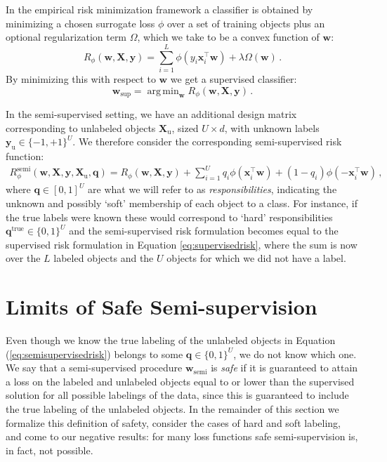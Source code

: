 \documentclass[twoside]{memoir}\usepackage[]{graphicx}\usepackage{xcolor}
\DeclareMathOperator*{\argmin}{arg\,min}
\begin{document}
In the empirical risk minimization framework a classifier is obtained by minimizing a chosen surrogate loss $\phi$ over a set of training objects plus an optional regularization term $\Omega$, which we take to be a convex function of $\mathbf{w}$:
\begin{equation} \label{eq:supervisedrisk}
R_\phi(\mathbf{w},\mathbf{X},\mathbf{y}) = \sum_{i=1}^L \phi(y_i \mathbf{x}_i^\top \mathbf{w}) + \lambda \Omega(\mathbf{w})\, .
\end{equation}
By minimizing this with respect to $\mathbf{w}$ we get a supervised classifier:
$$\mathbf{w}_\mathrm{sup} = \argmin_\mathbf{w} R_\phi(\mathbf{w},\mathbf{X},\mathbf{y}) \, .$$

In the semi-supervised setting, we have an additional design matrix corresponding to unlabeled objects $\mathbf{X}_\mathrm{u}$, sized $U \times d$, with unknown labels $\mathbf{y}_\mathrm{u} \in \{{-1},{+1}\}^U$.
We therefore consider the corresponding semi-supervised risk function:
\begin{align} \label{eq:semisupervisedrisk}
 {R}^\mathrm{semi}_\phi(\mathbf{w},\mathbf{X},\mathbf{y},\mathbf{X}_\mathrm{u},\mathbf{q}) =  R_\phi(\mathbf{w},\mathbf{X},\mathbf{y}) + \sum_{i=1}^{U} q_i \phi(\mathbf{x}_i^\top \mathbf{w}) + (1-q_i) \phi(-\mathbf{x}_i^\top \mathbf{w}) \, ,
\end{align}
where $\mathbf{q} \in [0,1]^U$ are what we will refer to as \emph{responsibilities}, indicating the unknown and possibly `soft' membership of each object to a class. For instance, if the true labels were known these would correspond to `hard' responsibilities $\mathbf{q}^\mathrm{true} \in \{0,1\}^U$ and the semi-supervised risk formulation becomes equal to the supervised risk formulation in Equation \eqref{eq:supervisedrisk}, where the sum is now over the $L$ labeled objects and the $U$ objects for which we did not have a label.

\section{Limits of Safe Semi-supervision} \label{section:limits}

Even though we know the true labeling of the unlabeled objects in Equation (\ref{eq:semisupervisedrisk}) belongs to some $\mathbf{q} \in \{0,1\}^U$, we do not know which one. We say that a semi-supervised procedure $\mathbf{w}_\mathrm{semi}$ is \emph{safe} if it is guaranteed to attain a loss on the labeled and unlabeled objects equal to or lower than the supervised solution for all possible labelings of the data, since this is guaranteed to include the true labeling of the unlabeled objects.  In the remainder of this section we formalize this definition of safety, consider the cases of hard and soft labeling, and come to our negative results: for many loss functions safe semi-supervision is, in fact, not possible.
\end{document}
